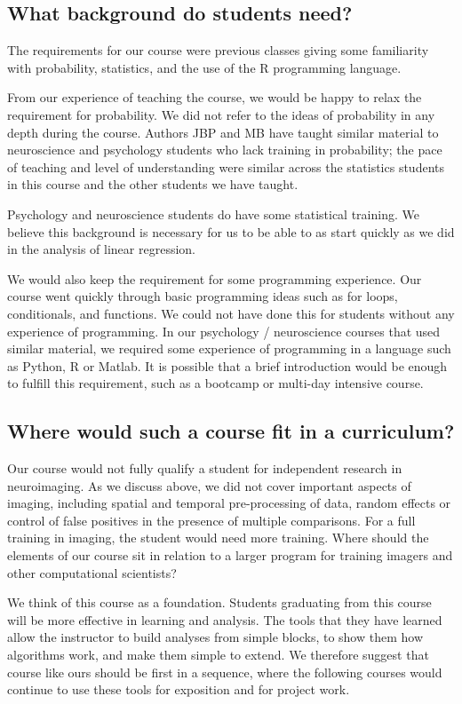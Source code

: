 \subsection{What background do students need?}

The requirements for our course were previous classes giving some familiarity
with probability, statistics, and the use of the R programming language.

From our experience of teaching the course, we would be happy to relax the
requirement for probability.  We did not refer to the ideas of
probability in any depth during the course.  Authors JBP and MB have taught
similar material to neuroscience and psychology students who lack training in
probability; the pace of teaching and level of understanding were similar
across the statistics students in this course and the other students we have
taught.

Psychology and neuroscience students do have some statistical training.  We
believe this background is necessary for us to be able to as start quickly as
we did in the analysis of linear regression.

We would also keep the requirement for some programming experience.  Our
course went quickly through basic programming ideas such as for loops,
conditionals, and functions.  We could not have done this for students without
any experience of programming.  In our psychology / neuroscience courses that
used similar material, we required some experience of programming in a
language such as Python, R or Matlab.  It is possible that a brief
introduction would be enough to fulfill this requirement, such as a bootcamp
or multi-day intensive course.

\subsection{Where would such a course fit in a curriculum?}

Our course would not fully qualify a student for independent research in
neuroimaging.  As we discuss above, we did not cover important aspects of
imaging, including spatial and temporal pre-processing of data, random effects
or control of false positives in the presence of multiple comparisons.  For a
full training in imaging, the student would need more training.  Where should
the elements of our course sit in relation to a larger program for training
imagers and other computational scientists?

We think of this course as a foundation.  Students graduating from this course
will be more effective in learning and analysis.  The tools that they have
learned allow the instructor to build analyses from simple blocks, to
show them how algorithms work, and make them simple to extend.  We therefore
suggest that course like ours should be first in a sequence, where the
following courses would continue to use these tools for exposition and for
project work.

